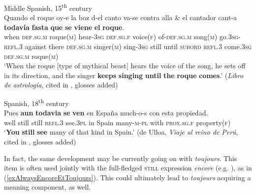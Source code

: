 \begin{exe}
	\ex Middle Spanish, 15\textsuperscript{th} century\label{exAlwaysMiddleSpanish}\\
	\gll Quando el roque oy-e la boz d-el canto va-se contra alla \& el cantador cant-a \textbf{todavía} \textbf{fasta} \textbf{que} \textbf{se} \textbf{viene} \textbf{el} \textbf{roque}.\\
when \textsc{def}.\textsc{sg}.\textsc{m} roque(\textsc{m}) hear-3\textsc{sg} \textsc{def}.\textsc{sg}.\textsc{f} voice(\textsc{f}) of-\textsc{def}.\textsc{sg}.\textsc{m} song(\textsc{m}) go.\textsc{3sg}-\textsc{refl}.3 against there {} \textsc{def}.\textsc{sg}.\textsc{m} singer(\textsc{m}) sing-3\textsc{sg} still until \textsc{subord} \textsc{refl}.3 come.3\textsc{sg} \textsc{def}.\textsc{sg}.\textsc{m} roque(\textsc{m})\\
	\glt \lq When the roque [type of mythical beast] hears the voice of the song, he sets off in its direction, and the singer \textbf{keeps} \textbf{singing} \textbf{until} \textbf{the} \textbf{roque} \textbf{comes}.' (\textit{Libro de astrología}, cited in \cite[211]{Bosque2016},  glosses added)

	\ex Spanish, 18\textsuperscript{th} century\label{exAlwaysSpanish18th}\\
	\gll Pues \textbf{aun} \textbf{todavia} \textbf{se} \textbf{ven} en España much-o-s con esta propiedad.\\
	well still still \textsc{refl}.3 see.3\textsc{pl} in Spain many-\textsc{m}-\textsc{pl} with \textsc{prox}.\textsc{sg}.\textsc{f} property(\textsc{f})\\
	\glt \lq \textbf{You} \textbf{still} \textbf{see} many of that kind in Spain.\rq{ }(de Ulloa, \textit{Viaje al reino de Perú}, cited in \cite[213]{Bosque2016},  glosses added)
\end{exe}

In fact, the same development may be currently going on with  \textit{toujours}. This item is often used jointly with the full-fledged \textsc{still} expression \textit{encore} (e.g. \cite[105]{MosegaardHansen2008}), as in (\ref{exAlwaysEncoreEtToujours}). This could ultimately lead to \textit{toujours} acquiring a  meaning component, as well.

